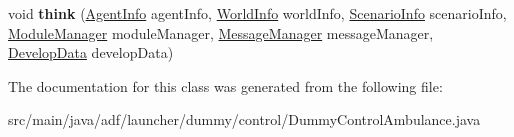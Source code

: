 \begin{DoxyCompactItemize}
\item 
\hypertarget{classadf_1_1launcher_1_1dummy_1_1control_1_1DummyControlAmbulance_ac43e9250db9403a32c58f81f0aaf08c4}{}\label{classadf_1_1launcher_1_1dummy_1_1control_1_1DummyControlAmbulance_ac43e9250db9403a32c58f81f0aaf08c4} 
void {\bfseries think} (\hyperlink{classadf_1_1agent_1_1info_1_1AgentInfo}{Agent\+Info} agent\+Info, \hyperlink{classadf_1_1agent_1_1info_1_1WorldInfo}{World\+Info} world\+Info, \hyperlink{classadf_1_1agent_1_1info_1_1ScenarioInfo}{Scenario\+Info} scenario\+Info, \hyperlink{classadf_1_1agent_1_1module_1_1ModuleManager}{Module\+Manager} module\+Manager, \hyperlink{classadf_1_1agent_1_1communication_1_1MessageManager}{Message\+Manager} message\+Manager, \hyperlink{classadf_1_1agent_1_1develop_1_1DevelopData}{Develop\+Data} develop\+Data)
\end{DoxyCompactItemize}


The documentation for this class was generated from the following file\+:\begin{DoxyCompactItemize}
\item 
src/main/java/adf/launcher/dummy/control/Dummy\+Control\+Ambulance.\+java\end{DoxyCompactItemize}
